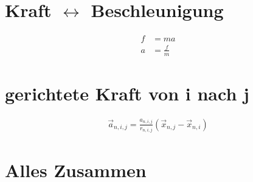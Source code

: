 \documentclass{article}
\begin{document}
\section*{Kraft $\leftrightarrow$ Beschleunigung}
\begin{align*}
	f&=ma\\
	a&=\frac{f}{m}
\end{align*}

\section*{gerichtete Kraft von i nach j}
\begin{align*}
	\vec{a}_{n,i,j}=\frac{a_{n,i,j}}{r_{n,i,j}}\left(\vec{x}_{n,j}-\vec{x}_{n,i}\right)
\end{align*}
\newpage
\section*{Alles Zusammen}
\end{document}
